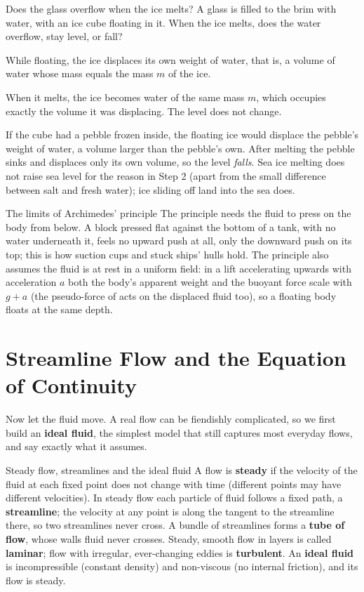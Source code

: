 \begin{exbox}{Does the glass overflow when the ice melts?}\label{ex:fluids-ice}
A glass is filled to the brim with water, with an ice cube floating in it. When the ice melts, does the
water overflow, stay level, or fall?

 While floating, the ice displaces its own weight of water, that is, a volume of water whose mass
equals the mass $m$ of the ice.

 When it melts, the ice becomes water of the same mass $m$, which occupies exactly the volume it was
displacing. The level does not change.

 If the cube had a pebble frozen inside, the floating ice would displace the pebble's weight of
water, a volume larger than the pebble's own. After melting the pebble sinks and displaces only its own
volume, so the level \emph{falls}. Sea ice melting does not raise sea level for the reason in Step 2
(apart from the small difference between salt and fresh water); ice sliding off land into the sea does.
\end{exbox}

\begin{remarkbox}{The limits of Archimedes' principle}
The principle needs the fluid to press on the body from below. A block pressed flat against the bottom of a
tank, with no water underneath it, feels no upward push at all, only the downward push on its top; this is
how suction cups and stuck ships' hulls hold. The principle also assumes the fluid is at rest in a uniform
field: in a lift accelerating upwards with acceleration $a$ both the body's apparent weight and the buoyant
force scale with $g+a$ (the pseudo-force of  acts on the displaced fluid too), so a
floating body floats at the same depth.
\end{remarkbox}

\section{Streamline Flow and the Equation of Continuity}\label{sec:continuity}

Now let the fluid move. A real flow can be fiendishly complicated, so we first build an \textbf{ideal
fluid}, the simplest model that still captures most everyday flows, and say exactly what it assumes.

\begin{defbox}{Steady flow, streamlines and the ideal fluid}
A flow is \textbf{steady} if the velocity of the fluid at each fixed point does not change with time
(different points may have different velocities). In steady flow each particle of fluid follows a fixed
path, a \textbf{streamline}; the velocity at any point is along the tangent to the streamline there, so two
streamlines never cross. A bundle of streamlines forms a \textbf{tube of flow}, whose walls fluid never
crosses. Steady, smooth flow in layers is called \textbf{laminar}; flow with irregular, ever-changing eddies
is \textbf{turbulent}. An \textbf{ideal fluid} is incompressible (constant density) and non-viscous (no
internal friction), and its flow is steady.
\end{defbox}

